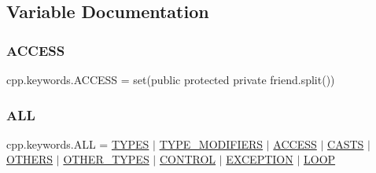 \subsection{Variable Documentation}
\mbox{\label{namespacecpp_1_1keywords_a786f41bbea982641425c819d10bb2064}} 
\subsubsection{\texorpdfstring{A\+C\+C\+E\+SS}{ACCESS}}
{\footnotesize\ttfamily cpp.\+keywords.\+A\+C\+C\+E\+SS = set(\textquotesingle{}public protected private friend\textquotesingle{}.split())}

\mbox{\label{namespacecpp_1_1keywords_a2e8727b78fb9434c99ac8518c6dd1ecc}} 
\subsubsection{\texorpdfstring{A\+LL}{ALL}}
{\footnotesize\ttfamily cpp.\+keywords.\+A\+LL = \hyperlink{namespacecpp_1_1keywords_a56fd5baf357970548e1ec366edfc2c13}{T\+Y\+P\+ES} $\vert$ \hyperlink{namespacecpp_1_1keywords_af9282ce418d6b4b43dca5ed574caedd7}{T\+Y\+P\+E\+\_\+\+M\+O\+D\+I\+F\+I\+E\+RS} $\vert$ \hyperlink{namespacecpp_1_1keywords_a786f41bbea982641425c819d10bb2064}{A\+C\+C\+E\+SS} $\vert$ \hyperlink{namespacecpp_1_1keywords_aeba38dc38e188040f4ec44ba05092e7f}{C\+A\+S\+TS} $\vert$ \hyperlink{namespacecpp_1_1keywords_a15fe231fbad145538b73892804898809}{O\+T\+H\+E\+RS} $\vert$ \hyperlink{namespacecpp_1_1keywords_aa86a5e35a3ace14022a5ca1b91baf207}{O\+T\+H\+E\+R\+\_\+\+T\+Y\+P\+ES} $\vert$ \hyperlink{namespacecpp_1_1keywords_a374dfe9c96681079802ba4724287b8ff}{C\+O\+N\+T\+R\+OL} $\vert$ \hyperlink{namespacecpp_1_1keywords_a2665fb8a25a4dae03fa5d3dc975c537c}{E\+X\+C\+E\+P\+T\+I\+ON} $\vert$ \hyperlink{namespacecpp_1_1keywords_af0164c05398a2291487b76414102d555}{L\+O\+OP}}

\mbox{\label{namespacecpp_1_1keywords_aeba38dc38e188040f4ec44ba05092e7f}} 
